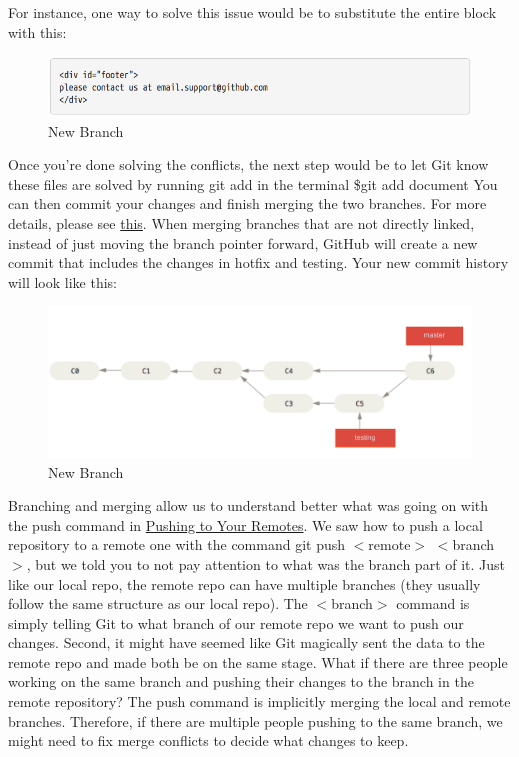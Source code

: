 \documentclass[12pt]{article}
\begin{document}
    \indent For instance, one way to solve this issue would be to substitute the entire block with this:
    \begin{figure}[h]
	\caption{New Branch}
	\includegraphics[scale=0.5]{figure11}
	\centering
    \end{figure} 
    \vspace{0.2 in}
    Once you're done solving the conflicts, the next step would be to let Git know these files are solved by running git add in the terminal
    \newline
    \newline
    \indent\indent \$git add document
    \newline
    \newline
    You can then commit your changes and finish merging the two branches.
    For more details, please see \href{https://git-scm.com/book/en/v2/Git-Branching-Basic-Branching-and-Merging}{this}.
    When merging branches that are not directly linked, instead of just moving the branch pointer forward, GitHub will create a new commit that includes the changes in hotfix and testing. Your new commit history will look like this:
    \begin{figure}[h]
	\caption{New Branch}
	\includegraphics[scale=0.5]{figure12}
	\centering
    \end{figure} 
    \vspace{0.2 in}
    Branching and merging allow us to understand better what was going on with the push command in \hyperref[sec:pushing]{Pushing to Your Remotes}. We saw how to push a local repository to a remote one with the command git push $<$remote$>$ $<$branch$>$, but we told you to not pay attention to what was the branch part of it. Just like our local repo, the remote repo can have multiple branches (they usually follow the same structure as our local repo). The $<$branch$>$ command is simply telling Git to what branch of our remote repo we want to push our changes. Second, it might have seemed like Git magically sent the data to the remote repo and made both be on the same stage. What if there are three people working on the same branch and pushing their changes to the branch in the remote repository? The push command is implicitly merging the local and remote branches. Therefore, if there are multiple people pushing to the same branch, we might need to fix merge conflicts to decide what changes to keep.
\end{document}
